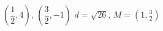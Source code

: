 {$\left( \dfrac{1}{2}, 4\right)$, $\left(\dfrac{3}{2}, -1\right)$ }
{$d = \sqrt{26}$, $M = \left(1, \frac{3}{2} \right)$}